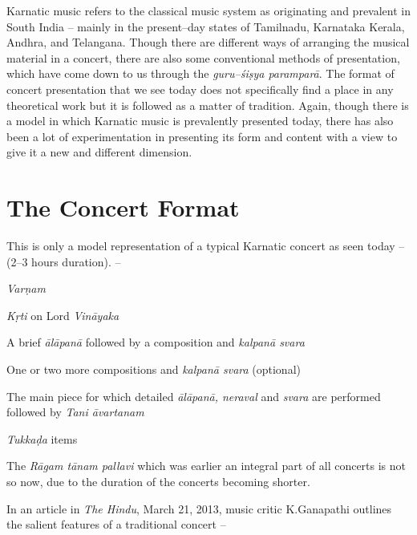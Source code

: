 Karnatic music refers to the classical music system as originating and prevalent in South India – mainly in the present–day states of Tamilnadu, Karnataka Kerala, Andhra, and Telangana. Though there are different ways of arranging the musical material in a concert, there are also some conventional methods of presentation, which have come down to us through the \textit{guru–śiṣya paramparā}. The format of concert presentation that we see today does not specifically find a place in any theoretical work but it is followed as a matter of tradition. Again, though there is a model in which Karnatic music is prevalently presented today, there has also been a lot of experimentation in presenting its form and content with a view to give it a new and different dimension.

\vspace{-.4cm}

\section*{The Concert Format}

This is only a model representation of a typical Karnatic concert as seen today – (2–3 hours duration). –

\textit{Varṇam}

\textit{Kṛti} on Lord \textit{Vināyaka}

A brief \textit{ālāpanā} followed by a composition and \textit{kalpanā svara}

One or two more compositions and \textit{kalpanā svara} (optional)

The main piece for which detailed \textit{ālāpanā, neraval} and \textit{svara} are performed followed by \textit{Tani āvartanam}

\textit{Tukkaḍa} items

The \textit{Rāgam tānam pallavi} which was earlier an integral part of all concerts is not so now, due to the duration of the concerts becoming shorter.

In an article in \textit{The Hindu}, March 21, 2013, music critic K.Ganapathi outlines the salient features of a traditional concert –

